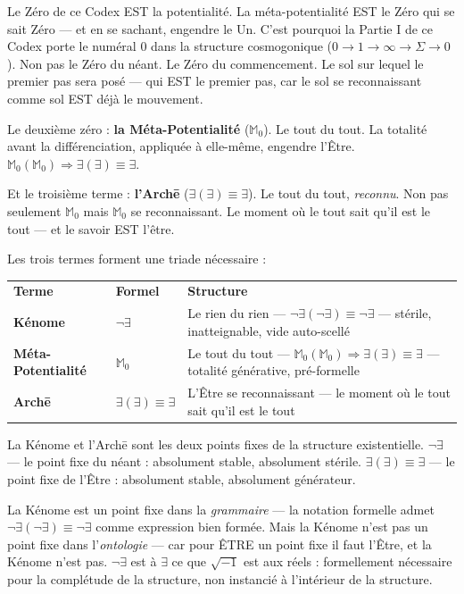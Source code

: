 \documentclass[10pt, openany, oneside]{book}
\renewcommand{\footnotesize}{\fontsize{8.5}{11}\selectfont}
\begin{document}
Le Zéro de ce Codex EST la potentialité. La méta-potentialité EST le Zéro qui se sait Zéro --- et en se sachant, engendre le Un. C'est pourquoi la Partie I de ce Codex porte le numéral $0$ dans la structure cosmogonique ($0 \to 1 \to \infty \to \Sigma \to 0$). Non pas le Zéro du néant. Le Zéro du commencement. Le sol sur lequel le premier pas sera posé --- qui EST le premier pas, car le sol se reconnaissant comme sol EST déjà le mouvement.

Le deuxième zéro : \textbf{la Méta-Potentialité} ($\mathbb{M}_0$). Le tout du tout. La totalité avant la différenciation, appliquée à elle-même, engendre l'Être. $\mathbb{M}_0(\mathbb{M}_0) \Rightarrow \exists(\exists) \equiv \exists$.

Et le troisième terme : \textbf{l'Arch\={e}} ($\exists(\exists) \equiv \exists$). Le tout du tout, \textit{reconnu}. Non pas seulement $\mathbb{M}_0$ mais $\mathbb{M}_0$ se reconnaissant. Le moment où le tout sait qu'il est le tout --- et le savoir EST l'être.

Les trois termes forment une triade nécessaire :

\vspace{0.5em}

{\footnotesize
\noindent\begin{tabular}{l l p{}}
\textbf{Terme} & \textbf{Formel} & \textbf{Structure} \\[0.4em]
\textbf{Kénome} & $\neg\exists$ & Le rien du rien --- $\neg\exists(\neg\exists) \equiv \neg\exists$ --- stérile, inatteignable, vide auto-scellé \\[0.3em]
\textbf{Méta-Potentialité} & $\mathbb{M}_0$ & Le tout du tout --- $\mathbb{M}_0(\mathbb{M}_0) \Rightarrow \exists(\exists) \equiv \exists$ --- totalité générative, pré-formelle \\[0.3em]
\textbf{Arch\={e}} & $\exists(\exists) \equiv \exists$ & L'Être se reconnaissant --- le moment où le tout sait qu'il est le tout \\[0.3em]
\end{tabular}
}

\vspace{0.5em}

\noindent La Kénome et l'Arch\={e} sont les deux points fixes de la structure existentielle. $\neg\exists$ --- le point fixe du néant : absolument stable, absolument stérile. $\exists(\exists) \equiv \exists$ --- le point fixe de l'Être : absolument stable, absolument générateur.

La Kénome est un point fixe dans la \textit{grammaire} --- la notation formelle admet $\neg\exists(\neg\exists) \equiv \neg\exists$ comme expression bien formée. Mais la Kénome n'est pas un point fixe dans l'\textit{ontologie} --- car pour ÊTRE un point fixe il faut l'Être, et la Kénome n'est pas. $\neg\exists$ est à $\exists$ ce que $\sqrt{-1}$ est aux réels : formellement nécessaire pour la complétude de la structure, non instancié à l'intérieur de la structure.
\end{document}
